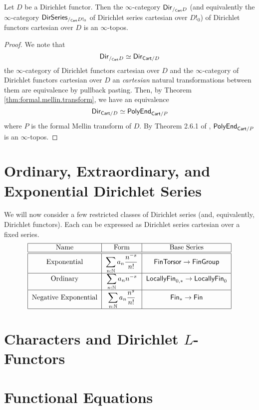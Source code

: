\begin{cor}
Let $D$ be a Dirichlet functor. Then the $\infty$-category $\operatorname{\mathsf{{Dir}}}_{/_{\mathsf{{Cart}}} D}$
(and equivalently the $\infty$-category $\operatorname{\mathsf{{DirSeries}}}_{/_{\mathsf{{Cart}}} D!_0}$ of
Dirichlet series cartesian over $D!_0$) of
Dirichlet functors cartesian over $D$ is an $\infty$-topos.
\end{cor}
\begin{proof}
  We note that
  $$\operatorname{\mathsf{{Dir}}}_{/_{\mathsf{{Cart}}} D} \simeq \operatorname{\mathsf{{Dir}}}_{\mathsf{{Cart}}/D}$$
  the $\infty$-category of Dirichlet functors cartesian over $D$ and the
  $\infty$-category of Dirichlet functors cartesian over $D$ an \emph{cartesian}
  natural transformations between them are equivalence by pullback pasting.
  Then, by Theorem \ref{thm:formal.mellin.transform}, we have an equivalence
  $$\operatorname{\mathsf{{Dir}}}_{\mathsf{{Cart}}/D} \simeq \mathsf{{PolyEnd}}_{\mathsf{{Cart}}/P}$$
  where $P$ is the formal Mellin transform of $D$. By Theorem 2.6.1 of
  \cite{GHK:Analytic.Monads}, $\mathsf{{PolyEnd}}_{\mathsf{{Cart}}/P}$ is an $\infty$-topos.
\end{proof}

\section{Ordinary, Extraordinary, and Exponential Dirichlet Series}

We will now consider a few restricted classes of Dirichlet series (and,
equivalently, Dirichlet functors). Each can be expressed as Dirichlet series
cartesian over a fixed series.
\[
  \begin{tabular}{|c|c|c|}
    \hline
    Name & Form & Base Series \\\hline\hline
    Exponential & $\displaystyle \sum_{n : \Nb} a_n\frac{n^{-s}}{n!}$ & $\type{FinTorsor} \to \type{FinGroup}$ \\ \hline
    Ordinary & $\displaystyle \sum_{n : \Nb} a_n n^{-s} $ & $\type{LocallyFin}_{0,\ast} \to \type{LocallyFin}_0$ \\ \hline
    Negative Exponential & $\displaystyle \sum_{n : \Nb} a_n \frac{n^s}{n!}$ & $\type{Fin}_{\ast} \to \type{Fin}$\\ \hline
  \end{tabular}
\]





\section{Characters and Dirichlet $L$-Functors}


\section{Functional Equations}
